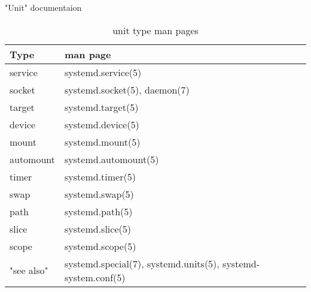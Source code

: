 \begin{frame}
	{"Unit" documentaion}
 \begin{longtable}{| m{5em} | m{30em} | }
                \caption{unit type man pages} \\
                \hline
                   \textbf{Type}                        &
		\textbf{man page}                    \\
                \hline
                service                                &
	       systemd.service(5) \\
                \hline
                   socket &
		systemd.socket(5), daemon(7)     \\
                \hline
                target &
		systemd.target(5) \\
                \hline
                 device &
		 systemd.device(5) \\
                   \hline
                   mount &
		   systemd.mount(5) \\
                   \hline
                   automount &
		   systemd.automount(5) \\
                   \hline
                   timer  &
		   systemd.timer(5) \\
                   \hline
                   swap &
		   systemd.swap(5) \\
                   \hline
                   path &
		   systemd.path(5) \\
                   \hline
                   slice &
                   systemd.slice(5) \\
                   \hline
                   scope &
		   systemd.scope(5) \\
                   \hline
		   "see also" &
		   systemd.special(7), systemd.units(5), systemd-system.conf(5) \\ 
		   \hline


        \end{longtable}

\end{frame}

\cprotect\note{

}

